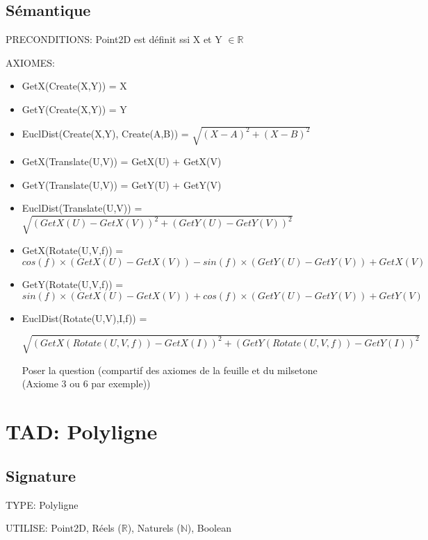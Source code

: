 \documentclass[a4paper, 11pt, oneside]{article}
\begin{document}
\subsection{Sémantique}
\noindent PRECONDITIONS: Point2D est définit ssi X et Y $\in \mathbb{R}$ 

\noindent AXIOMES: 
\begin{itemize}
    \item GetX(Create(X,Y)) = X
    \item GetY(Create(X,Y)) = Y
    \item EuclDist(Create(X,Y), Create(A,B)) = $\sqrt{{(X-A)}^{2}+{(X-B)}^{2}}$
    \item GetX(Translate(U,V)) = GetX(U) + GetX(V)
    \item GetY(Translate(U,V)) = GetY(U) + GetY(V)
    \item EuclDist(Translate(U,V)) = $\sqrt{{(GetX(U)-GetX(V))}^{2}+{(GetY(U)-GetY(V))}^{2}}$
    \item GetX(Rotate(U,V,f)) = $cos(f) \times (GetX(U)-GetX(V)) - sin(f) \times (GetY(U)-GetY(V)) + GetX(V) $ 
    \item GetY(Rotate(U,V,f)) = $sin(f) \times (GetX(U)-GetX(V)) + cos(f) \times (GetY(U)-GetY(V)) + GetY(V) $ 
    \item EuclDist(Rotate(U,V),I,f)) =
    
    $\sqrt{{(GetX(Rotate(U,V,f))-GetX(I))}^{2}+{(GetY(Rotate(U,V,f))-GetY(I))}^{2}}$
    
    {\color{red} Poser la question (compartif des axiomes de la feuille et du milsetone (Axiome 3 ou 6 par exemple))}
\end{itemize}


\section{TAD: Polyligne}

\subsection{Signature}

\noindent TYPE: Polyligne

\noindent UTILISE: Point2D, Réels ($\mathbb{R}$), Naturels ($\mathbb{N}$), Boolean
\end{document}
